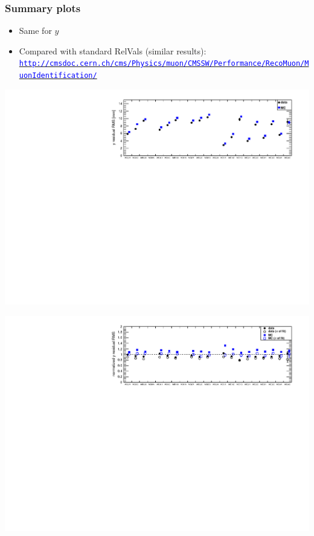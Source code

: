 \documentclass[compress]{beamer}
\begin{document}
\begin{frame}
\frametitle{Summary plots}

\begin{itemize}
\item Same for $y$
\item Compared with standard RelVals (similar results):
\href{http://cmsdoc.cern.ch/cms/Physics/muon/CMSSW/Performance/RecoMuon/MuonIdentification/}{\textcolor{blue}{\tt \tiny http://cmsdoc.cern.ch/cms/Physics/muon/CMSSW/Performance/RecoMuon/MuonIdentification/}}
\end{itemize}
\begin{center}
\includegraphics[width=0.9\linewidth]{summaryY.pdf}

\includegraphics[width=0.9\linewidth]{summaryYnorm.pdf}
\end{center}
\end{frame}
\end{document}
